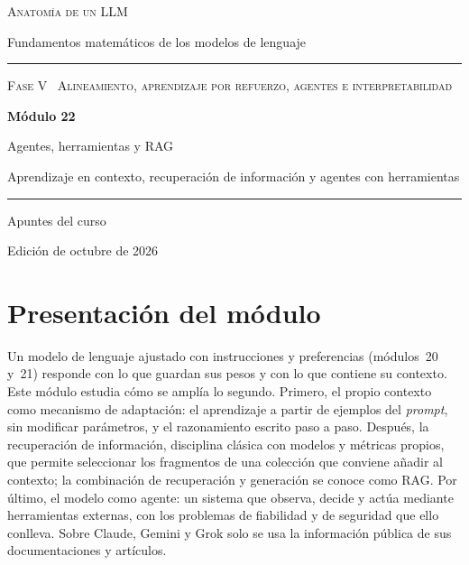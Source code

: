 \documentclass[11pt,a4paper,twoside,openany]{book}
\begin{document}
\frontmatter
\begin{titlepage}
\centering
\vspace*{2.5cm}
{\large\scshape Anatomía de un LLM}\par
\vspace{0.4cm}
{\normalsize Fundamentos matemáticos de los modelos de lenguaje}\par
\vspace{2.2cm}
\rule{\textwidth}{0.8pt}\par\vspace{0.5cm}
{\small\scshape Fase V \textperiodcentered\ Alineamiento, aprendizaje por refuerzo, agentes e interpretabilidad}\par\vspace{0.3cm}
{\Huge\bfseries Módulo 22\par}\vspace{0.3cm}
{\LARGE Agentes, herramientas y RAG\par}
\vspace{0.2cm}
{\large Aprendizaje en contexto, recuperación de información y agentes con herramientas\par}
\vspace{0.5cm}\rule{\textwidth}{0.4pt}\par
\vspace{1.6cm}
{\large Apuntes del curso}\par
\vfill
{\small Edición de octubre de 2026}\par
\end{titlepage}

\chapter*{Presentación del módulo}

Un modelo de lenguaje ajustado con instrucciones y preferencias (módulos~20 y~21) responde con lo que guardan sus pesos y con lo que contiene su contexto. Este módulo estudia cómo se amplía lo segundo. Primero, el propio contexto como mecanismo de adaptación: el aprendizaje a partir de ejemplos del \emph{prompt}, sin modificar parámetros, y el razonamiento escrito paso a paso. Después, la recuperación de información, disciplina clásica con modelos y métricas propios, que permite seleccionar los fragmentos de una colección que conviene añadir al contexto; la combinación de recuperación y generación se conoce como RAG. Por último, el modelo como agente: un sistema que observa, decide y actúa mediante herramientas externas, con los problemas de fiabilidad y de seguridad que ello conlleva. Sobre Claude, Gemini y Grok solo se usa la información pública de sus documentaciones y artículos.
\end{document}
